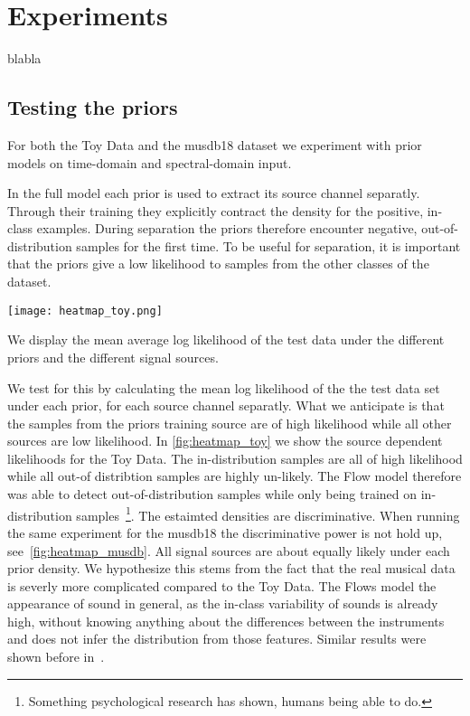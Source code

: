 \chapter{Experiments}%
\label{ch:experiments}

blabla

\section{Testing the priors}

For both the Toy Data and the musdb18 dataset we experiment with prior models on time-domain and spectral-domain input.

In the full model each prior is used to extract its source channel separatly. Through their training they explicitly contract the density for the positive, in-class examples. During separation the priors therefore encounter negative, out-of-distribution samples for the first time. To be useful for separation, it is important that the priors give a low likelihood to samples from the other classes of the dataset.

\begin{marginfigure}
    \texttt{[image: heatmap\_toy.png]}%
    \caption{We display the mean average log likelihood of the test data under the different priors and the different signal sources.}%
    \label{fig:heatmap_toy}
\end{marginfigure}

We test for this by calculating the mean log likelihood of the the test data set under each prior, for each source channel separatly. What we anticipate is that the samples from the priors training source are of high likelihood while all other sources are low likelihood. In \cref{fig:heatmap_toy} we show the source dependent likelihoods for the Toy Data. The in-distribution samples are all of high likelihood while all out-of distribtion samples are highly un-likely. The Flow model therefore was able to detect out-of-distribution samples while only being trained on in-distribution samples~\footnote{Something psychological research has shown, humans being able to do.}. The estaimted densities are discriminative. When running the same experiment for the musdb18 the discriminative power is not hold up, see~\cref{fig:heatmap_musdb}. All signal sources are about equally likely under each prior density. We hypothesize this stems from the fact that the real musical data is severly more complicated compared to the Toy Data. The Flows model the appearance of sound in general, as the in-class variability of sounds is already high, without knowing anything about the  differences between the instruments and does not infer the distribution from those features. Similar results were shown before in~.

